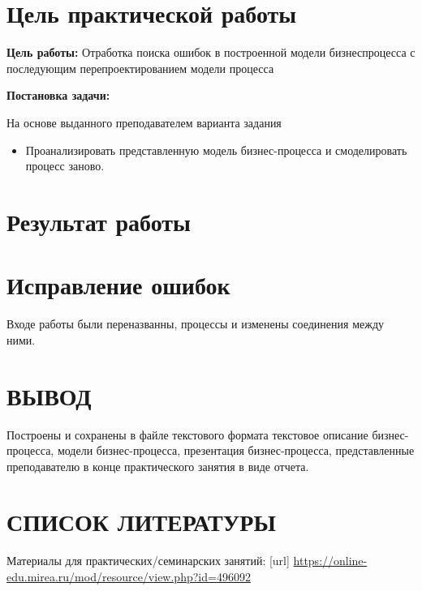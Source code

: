 
\section*{\LARGE Цель практической работы}

\textbf{Цель работы:} Отработка поиска ошибок в построенной модели бизнеспроцесса с последующим перепроектированием
модели процесса



\textbf{Постановка задачи:}\par
На основе выданного преподавателем варианта задания
\begin{itemize}
    \item Проанализировать представленную модель бизнес-процесса и смоделировать процесс заново.
\end{itemize}


\newpage

\section*{\LARGE Результат работы}

\section{Исправление ошибок}
Входе работы были переназванны, процессы и изменены соединения между ними.
\clearpage

\newpage

\section*{ВЫВОД}
Построены и сохранены в
файле текстового формата текстовое описание бизнес-процесса, модели
бизнес-процесса, презентация бизнес-процесса, представленные
преподавателю в конце практического занятия в виде отчета.
\newpage

\section*{СПИСОК ЛИТЕРАТУРЫ}
\begin{thebibliography}{}
    \bibitem{}  Материалы для практических/семинарских занятий: [url]
    \url{https://online-edu.mirea.ru/mod/resource/view.php?id=496092}
\end{thebibliography}
